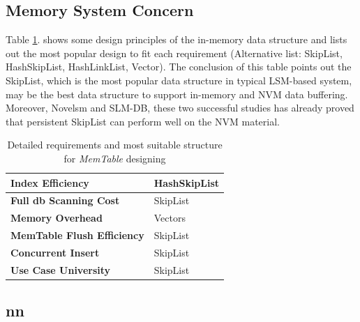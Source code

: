 \subsection{Memory System Concern}
Table \ref{tab:memtable_requirment}. shows some design principles of the in-memory data structure and lists out the most popular design to fit each requirement\cite{MemTable29:online} (Alternative list: SkipList, HashSkipList, HashLinkList, Vector). The conclusion of this table points out the SkipList, which is the most popular data structure in typical LSM-based system, may be the best data structure to support in-memory and NVM data buffering. Moreover, Novelsm\cite{kannan2018redesigning} and SLM-DB\cite{kaiyrakhmet2019slm}, these two successful studies has already proved that persistent SkipList can perform well on the NVM material.
\begin{table}
	\centering
	\begin{tabular}{|p{}|p{}|}
		\hline
		\textbf{Index Efficiency} & HashSkipList \\ \hline
		\textbf{Full db Scanning Cost} & SkipList \\ \hline
		\textbf{Memory Overhead} & Vectors \\ \hline
		\textbf{MemTable Flush Efficiency} & SkipList \\ \hline
		\textbf{Concurrent Insert} & SkipList \\ \hline
		\textbf{Use Case University} & SkipList\\ \hline
	\end{tabular}
	\caption{Detailed requirements and most suitable structure for \textit{MemTable} designing}
	\label{tab:memtable_requirment}
\end{table}

\subsection{ nn}







